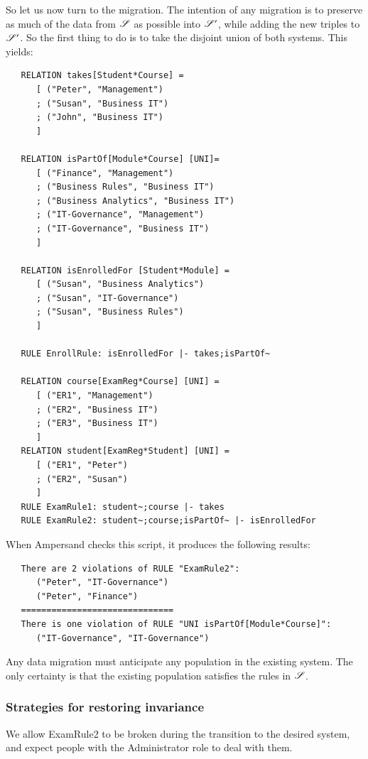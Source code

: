 \documentclass{elsarticle}
\begin{document}
   So let us now turn to the migration.
   The intention of any migration is to preserve as much of the data from $\mathscr{S}$ as possible into $\mathscr{S}'$,
   while adding the new triples to $\mathscr{S}'$.
   So the first thing to do is to take the disjoint union of both systems.
   This yields:
\begin{verbatim}
   RELATION takes[Student*Course] =
      [ ("Peter", "Management")
      ; ("Susan", "Business IT")
      ; ("John", "Business IT")
      ]
   
   RELATION isPartOf[Module*Course] [UNI]=
      [ ("Finance", "Management")
      ; ("Business Rules", "Business IT")
      ; ("Business Analytics", "Business IT")
      ; ("IT-Governance", "Management")
      ; ("IT-Governance", "Business IT")
      ]
   
   RELATION isEnrolledFor [Student*Module] =
      [ ("Susan", "Business Analytics")
      ; ("Susan", "IT-Governance")
      ; ("Susan", "Business Rules")
      ]
   
   RULE EnrollRule: isEnrolledFor |- takes;isPartOf~
   
   RELATION course[ExamReg*Course] [UNI] =
      [ ("ER1", "Management")
      ; ("ER2", "Business IT")
      ; ("ER3", "Business IT")
      ]
   RELATION student[ExamReg*Student] [UNI] =
      [ ("ER1", "Peter")
      ; ("ER2", "Susan")
      ]
   RULE ExamRule1: student~;course |- takes
   RULE ExamRule2: student~;course;isPartOf~ |- isEnrolledFor
\end{verbatim}
   When Ampersand checks this script, it produces the following results:
\begin{verbatim}
   There are 2 violations of RULE "ExamRule2":
      ("Peter", "IT-Governance")
      ("Peter", "Finance")
   ==============================
   There is one violation of RULE "UNI isPartOf[Module*Course]":
      ("IT-Governance", "IT-Governance")
\end{verbatim}
   Any data migration must anticipate any population in the existing system.
   The only certainty is that the existing population satisfies the rules in $\mathscr{S}$.

\subsubsection{Strategies for restoring invariance}

We allow ExamRule2 to be broken during the transition to the desired system, and expect people with the Administrator role to deal with them.
\end{document}
